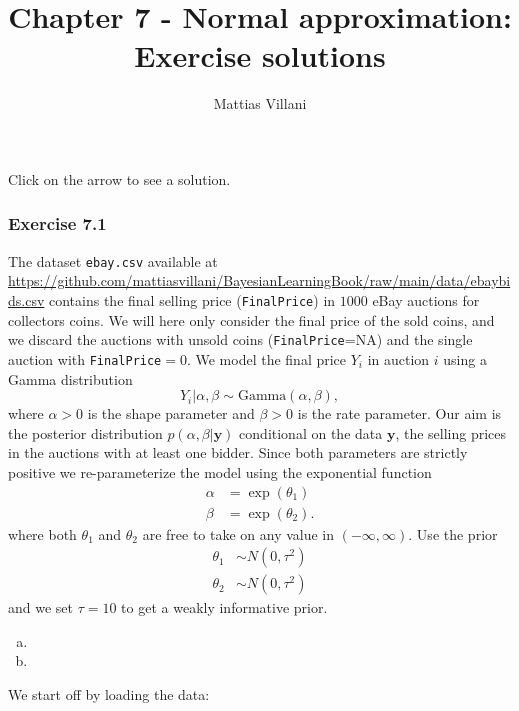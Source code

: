 \documentclass[
  letterpaper,
  DIV=11,
  numbers=noendperiod]{scrartcl}
\title{Chapter 7 - Normal approximation: Exercise solutions}
\author{Mattias Villani}
\date{}
\begin{document}
\maketitle


Click on the arrow to see a solution.

\subsubsection{Exercise 7.1}\label{exercise-7.1}

The dataset \texttt{ebay.csv} available at
\url{https://github.com/mattiasvillani/BayesianLearningBook/raw/main/data/ebaybids.csv}
contains the final selling price (\texttt{FinalPrice}) in \(1000\) eBay
auctions for collectors coins. We will here only consider the final
price of the sold coins, and we discard the auctions with unsold coins
(\texttt{FinalPrice}=NA) and the single auction with
\texttt{FinalPrice}\(=0\). We model the final price \(Y_i\) in auction
\(i\) using a Gamma distribution \begin{equation*}
   Y_i \vert \alpha,\beta \sim \mathrm{Gamma}(\alpha,\beta),
  \end{equation*} where \(\alpha>0\) is the shape parameter and
\(\beta>0\) is the rate parameter. Our aim is the posterior distribution
\(p(\alpha, \beta \vert \mathbf{y})\) conditional on the data
\(\mathbf{y}\), the selling prices in the auctions with at least one
bidder. Since both parameters are strictly positive we re-parameterize
the model using the exponential function \begin{align*}
    \alpha &= \exp(\theta_1)\\
    \beta &= \exp(\theta_2).
  \end{align*} where both \(\theta_1\) and \(\theta_2\) are free to take
on any value in \((-\infty,\infty)\). Use the prior \begin{align*}
    \theta_1 &\sim N(0, \tau^2)\\
    \theta_2 &\sim N(0, \tau^2)
  \end{align*} and we set \(\tau=10\) to get a weakly informative prior.

\begin{enumerate}[(a)]
    \item   
    \item   
\end{enumerate}

We start off by loading the data:
\end{document}
